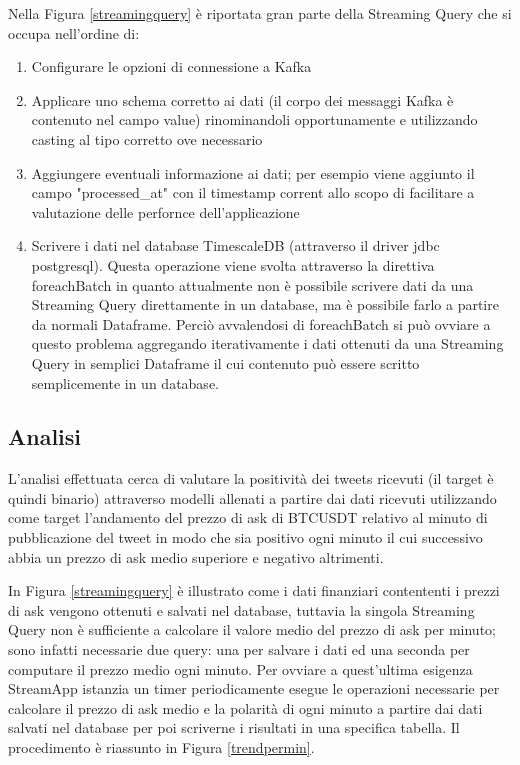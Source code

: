 Nella Figura \ref{streamingquery} è riportata gran parte della Streaming Query che si occupa
nell'ordine di:
\begin{enumerate}
    \item Configurare le opzioni di connessione a Kafka
    \item Applicare uno schema corretto ai dati (il corpo dei messaggi Kafka è contenuto nel campo
    value) rinominandoli opportunamente e utilizzando casting al tipo corretto ove necessario
    \item Aggiungere eventuali informazione ai dati; per esempio viene aggiunto il campo
    "processed\_at" con il timestamp corrent allo scopo di facilitare a valutazione delle perfornce
    dell'applicazione
    \item Scrivere i dati nel database TimescaleDB (attraverso il driver jdbc postgresql). Questa
    operazione viene svolta attraverso la direttiva foreachBatch in quanto attualmente non è
    possibile scrivere dati da una Streaming Query direttamente in un database, ma è possibile farlo a
    partire da normali Dataframe. Perciò avvalendosi di foreachBatch si può ovviare a questo
    problema aggregando iterativamente i dati ottenuti da una Streaming Query in semplici Dataframe
    il cui contenuto può essere scritto semplicemente in un database.

\end{enumerate}

\subsection{Analisi}

L'analisi effettuata cerca di valutare la positività dei tweets ricevuti (il target è quindi
binario) attraverso modelli allenati a partire dai dati ricevuti utilizzando come target
l'andamento del prezzo di ask di BTCUSDT relativo al minuto di pubblicazione del tweet in modo
che sia positivo ogni minuto il cui successivo abbia un prezzo di ask medio superiore e
negativo altrimenti.

In Figura \ref{streamingquery} è illustrato come i dati finanziari contententi i prezzi di ask
vengono ottenuti e salvati nel database, tuttavia la singola Streaming Query non è sufficiente
a calcolare il valore medio del prezzo di ask per minuto; sono infatti necessarie due query: una
per salvare i dati ed una seconda per computare il prezzo medio ogni minuto. Per ovviare a
quest'ultima esigenza StreamApp istanzia un timer periodicamente esegue le operazioni necessarie
per calcolare il prezzo di ask medio e la polarità di ogni minuto a partire dai
dati salvati nel database per poi scriverne i risultati in una specifica tabella. Il procedimento
è riassunto in Figura \ref{trendpermin}.

